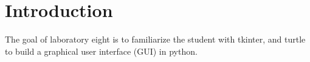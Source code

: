 \section{Introduction}\label{sec: Introduction}
The goal of laboratory eight is to familiarize the student with tkinter, and turtle to build a graphical user interface (GUI) in python.